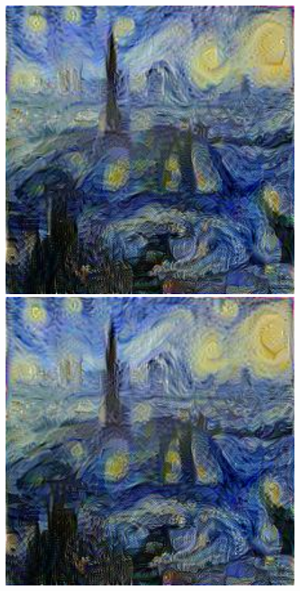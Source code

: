 \documentclass{article}
\begin{document}
\begin{figure}[!htb]
\centering
\begin{minipage}{0.2\textwidth}
\centering
\includegraphics[width=0.98\textwidth]{../Images/transfer/paris_starrynight_w_06_01_01_01_01.jpg}
\end{minipage}%
\begin{minipage}{0.2\textwidth}
\centering
\includegraphics[width=0.98\textwidth]{../Images/transfer/paris_starrynight_w_035_025_02_015_005.jpg}

\end{minipage}
\end{figure}
\end{document}

